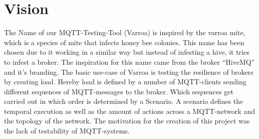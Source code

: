 \chapter{Vision}
The Name of our MQTT-Testing-Tool (Varroa) is inspired by the varroa mite, which is a species of mite that infects honey bee colonies.
This name has been chosen due to it working in a similar way but instead of infesting a hive, it tries to infest a broker.
The inspiration for this name came from the broker \enquote{HiveMQ} and it's branding.
The basic use-case of Varroa is testing the resilience of brokers by creating load.
Hereby load is defined by a number of MQTT-clients sending different sequences of MQTT-messages to the broker. 
Which sequences get carried out in which order is determined by a Scenario.
A scenario defines the temporal execution as well as the amount of actions across a MQTT-network and the topology of the network.
The motivation for the creation of this project was the lack of testability of MQTT-systems.\\

